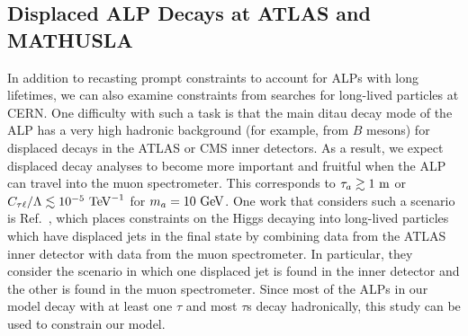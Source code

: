 \subsection{Displaced ALP Decays at ATLAS and MATHUSLA}\label{sec:higgs_decay_ATLAS}
In addition to recasting prompt constraints to account for ALPs with long lifetimes, we can also examine constraints from searches for long-lived particles at CERN. One difficulty with such a task is that the main ditau decay mode of the ALP has a very high hadronic background (for example, from $B$ mesons) for displaced decays in the ATLAS or CMS inner detectors. As a result, we expect displaced decay analyses to become more important and fruitful when the ALP can travel into the muon spectrometer. This corresponds to $\tau_a\gtrsim1~{\rm m}$ or $C_{\tau \ell}/\Lambda \lesssim 10^{-5}~{\rm TeV}^{-1}$ for $m_a = 10~{\rm GeV}$. One work that considers such a scenario is Ref.~\cite{ATLAS:2022zhj}, which places constraints on the Higgs decaying into long-lived particles which have displaced jets in the final state by combining data from the ATLAS inner detector with data from the muon spectrometer. In particular, they consider the scenario in which one displaced jet is found in the inner detector and the other is found in the muon spectrometer. Since most of the ALPs in our model decay with at least one $\tau$ and most $\tau$s decay hadronically, this study can be used to constrain our model.

